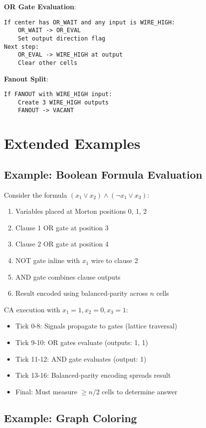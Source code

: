 \documentclass[11pt]{article}
\theoremstyle{plain}
\theoremstyle{definition}
\theoremstyle{remark}
\begin{document}
\textbf{OR Gate Evaluation}:
\begin{verbatim}
If center has OR_WAIT and any input is WIRE_HIGH:
    OR_WAIT -> OR_EVAL
    Set output direction flag
Next step:
    OR_EVAL -> WIRE_HIGH at output
    Clear other cells
\end{verbatim}

\textbf{Fanout Split}:
\begin{verbatim}
If FANOUT with WIRE_HIGH input:
    Create 3 WIRE_HIGH outputs
    FANOUT -> VACANT
\end{verbatim}

\section{Extended Examples}
\label{app:examples}

\subsection{Example: Boolean Formula Evaluation}

Consider the formula $(x_1 \lor x_2) \land (\neg x_1 \lor x_3)$:

\begin{enumerate}
\item Variables placed at Morton positions 0, 1, 2
\item Clause 1 OR gate at position 3
\item Clause 2 OR gate at position 4  
\item NOT gate inline with $x_1$ wire to clause 2
\item AND gate combines clause outputs
\item Result encoded using balanced-parity across $n$ cells
\end{enumerate}

CA execution with $x_1 = 1, x_2 = 0, x_3 = 1$:
\begin{itemize}
\item Tick 0-8: Signals propagate to gates (lattice traversal)
\item Tick 9-10: OR gates evaluate (outputs: 1, 1)
\item Tick 11-12: AND gate evaluates (output: 1)
\item Tick 13-16: Balanced-parity encoding spreads result
\item Final: Must measure $\geq n/2$ cells to determine answer
\end{itemize}

\subsection{Example: Graph Coloring}
\end{document}
